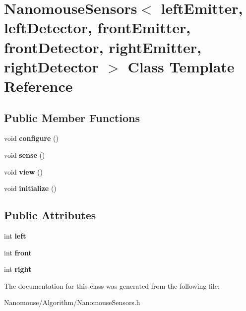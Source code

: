 \hypertarget{class_nanomouse_sensors}{}\section{Nanomouse\+Sensors$<$ left\+Emitter, left\+Detector, front\+Emitter, front\+Detector, right\+Emitter, right\+Detector $>$ Class Template Reference}
\label{class_nanomouse_sensors}
\subsection*{Public Member Functions}
\begin{DoxyCompactItemize}
\item 
\hypertarget{class_nanomouse_sensors_a0d988b145c814a20fc6b8c6c09d34dac}{}void {\bfseries configure} ()\label{class_nanomouse_sensors_a0d988b145c814a20fc6b8c6c09d34dac}

\item 
\hypertarget{class_nanomouse_sensors_a329717995742e03aec30e012cae10fdd}{}void {\bfseries sense} ()\label{class_nanomouse_sensors_a329717995742e03aec30e012cae10fdd}

\item 
\hypertarget{class_nanomouse_sensors_af20fe0c3e295aa432ad5dc22ae9c54dd}{}void {\bfseries view} ()\label{class_nanomouse_sensors_af20fe0c3e295aa432ad5dc22ae9c54dd}

\item 
\hypertarget{class_nanomouse_sensors_a78587853f1e8057652cd01368575434e}{}void {\bfseries initialize} ()\label{class_nanomouse_sensors_a78587853f1e8057652cd01368575434e}

\end{DoxyCompactItemize}
\subsection*{Public Attributes}
\begin{DoxyCompactItemize}
\item 
\hypertarget{class_nanomouse_sensors_ae07140fc6b20790750e89cd4aac6140a}{}int {\bfseries left}\label{class_nanomouse_sensors_ae07140fc6b20790750e89cd4aac6140a}

\item 
\hypertarget{class_nanomouse_sensors_ac6e860dda9435256144370d20b74d6b7}{}int {\bfseries front}\label{class_nanomouse_sensors_ac6e860dda9435256144370d20b74d6b7}

\item 
\hypertarget{class_nanomouse_sensors_a906a311af880f24e235bcfede701a5e4}{}int {\bfseries right}\label{class_nanomouse_sensors_a906a311af880f24e235bcfede701a5e4}

\end{DoxyCompactItemize}


The documentation for this class was generated from the following file\+:\begin{DoxyCompactItemize}
\item 
Nanomouse/\+Algorithm/Nanomouse\+Sensors.\+h\end{DoxyCompactItemize}
